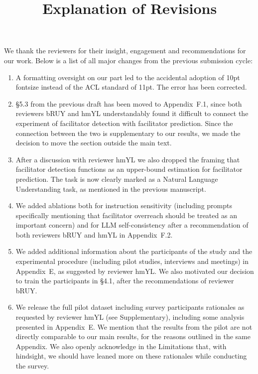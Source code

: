 \documentclass[11pt,a4paper]{article}
\date{}
\title{Explanation of Revisions}
\begin{document}
	\maketitle	
	
	We thank the reviewers for their insight, engagement and recommendations for our work. Below is a list of all major changes from the previous submission cycle:
	\begin{enumerate}
		\item A formatting oversight on our part led to the accidental adoption of 10pt fontsize instead of the ACL standard of 11pt. The error has been corrected.
		
		\item \S5.3 from the previous draft has been moved to Appendix~F.1, since both reviewers bRUY and hmYL understandably found it difficult to connect the experiment of facilitator detection with facilitator prediction. Since the connection between the two is supplementary to our results, we made the decision to move the section outside the main text.
		
		\item After a discussion with reviewer hmYL we also dropped the framing that facilitator detection functions as an upper-bound estimation for facilitator prediction. The task is now clearly marked as a Natural Language Understanding task, as mentioned in the previous manuscript.
		
		\item We added ablations both for instruction sensitivity (including prompts specifically mentioning that facilitator overreach should be treated as an important concern) and for LLM self-consistency after a recommendation of both reviewers bRUY and hmYL in Appendix~F.2.
		
		\item We added additional information about the participants of the study and the experimental procedure (including pilot studies, interviews and meetings) in Appendix~E, as suggested by reviewer hmYL. We also motivated our decision to train the participants in \S4.1, after the recommendations of reviewer bRUY.
		
		\item We release the full pilot dataset including survey participants rationales as requested by reviewer hmYL (see Supplementary), including some analysis presented in Appendix~E. We mention that the results from the pilot are not directly comparable to our main results, for the reasons outlined in the same Appendix. We also openly acknowledge in the Limitations that, with hindsight, we should have leaned more on these rationales while conducting the survey.
		

\end{enumerate}
\end{document}
